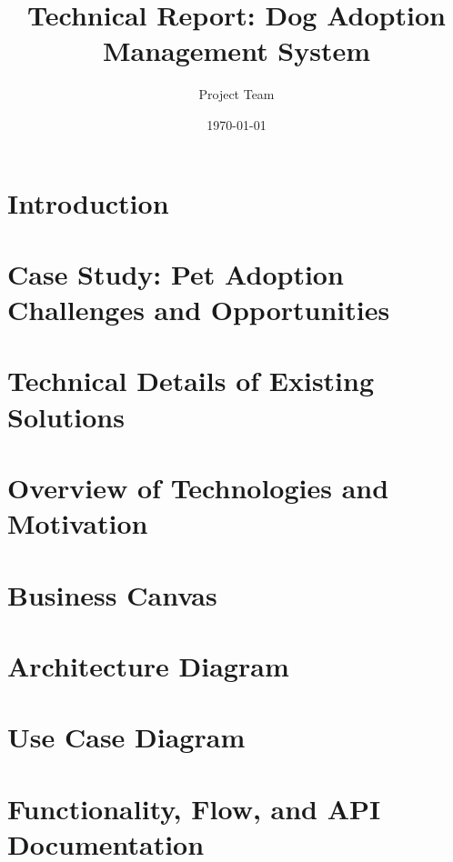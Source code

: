 \documentclass[12pt,a4paper]{report}
\title{Technical Report: Dog Adoption Management System}
\author{Project Team}
\date{\today}
\begin{document}
\maketitle

\tableofcontents

\chapter{Introduction}


\chapter{Case Study: Pet Adoption Challenges and Opportunities}


\chapter{Technical Details of Existing Solutions}


\chapter{Overview of Technologies and Motivation}


\chapter{Business Canvas}


\chapter{Architecture Diagram}


\chapter{Use Case Diagram}


\chapter{Functionality, Flow, and API Documentation}

\end{document}
